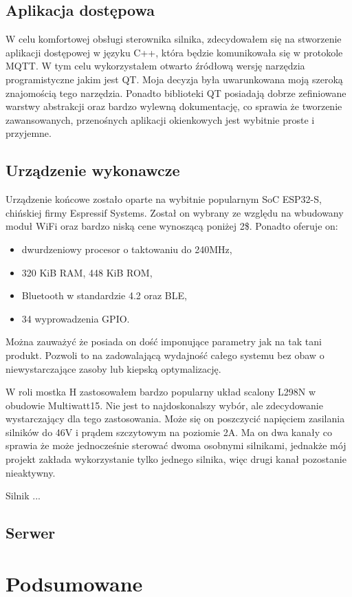 \documentclass[a4paper, 12pt]{article}
\begin{document}
  \subsection{Aplikacja dostępowa}
  W celu komfortowej obsługi sterownika silnika,
  zdecydowałem się na stworzenie aplikacji dostępowej w 
  języku C++, która będzie komunikowała się w protokole MQTT.
  W tym celu wykorzystałem otwarto źródłową wersję narzędzia
  programistyczne jakim jest QT.
  Moja decyzja była uwarunkowana moją szeroką znajomością
  tego narzędzia. Ponadto biblioteki QT posiadają dobrze 
  zefiniowane warstwy abstrakcji oraz bardzo wylewną 
  dokumentację, co sprawia że tworzenie zawansowanych, 
  przenośnych aplikacji okienkowych jest wybitnie proste i 
  przyjemne. 

  \subsection{Urządzenie wykonawcze}
  Urządzenie końcowe zostało oparte na wybitnie popularnym
  SoC ESP32-S, chińskiej firmy Espressif Systems. 
  Został on wybrany ze względu na wbudowany moduł WiFi oraz
  bardzo niską cene wynoszącą poniżej 2\$. Ponadto oferuje on:

  \begin{itemize}
    \item dwurdzeniowy procesor o taktowaniu do 240MHz,
    \item 320 KiB RAM, 448 KiB ROM,
    \item Bluetooth w standardzie 4.2 oraz BLE,
    \item 34 wyprowadzenia GPIO.
  \end{itemize}

  Można zauważyć że posiada on dość imponujące parametry 
  jak na tak tani produkt. Pozwoli to na zadowalającą wydajność
  całego systemu bez obaw o niewystarczające zasoby lub 
  kiepską optymalizację.

  W roli mostka H zastosowałem bardzo popularny układ scalony
  L298N w obudowie Multiwatt15. Nie jest to najdoskonalszy wybór,
  ale zdecydowanie wystarczający dla tego zastosowania. 
  Może się on poszczycić napięciem zasilania silników do 46V i 
  prądem szczytowym na poziomie 2A. Ma on dwa kanały co sprawia że
  może jednocześnie sterować dwoma osobnymi silnikami, jednakże
  mój projekt zakłada wykorzystanie tylko jednego silnika, więc 
  drugi kanał pozostanie nieaktywny.

  Silnik ...

  \subsection{Serwer}


  \section{Podsumowane}


  \cite{test}

  
\end{document}
